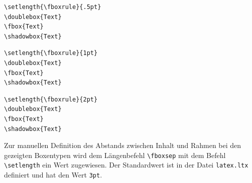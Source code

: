 \documentclass[a4paper,10pt,twoside]{scrbook}
\begin{document}
\begin{minipage}[c]{0.5\textwidth}
\setlength{\parskip}{1em}
\setlength{\fboxrule}{.4pt}
\hspace{5mm}
\hspace{5mm}
\hspace{5mm}
\hfill
\end{minipage}
\hfill
\begin{minipage}[c]{0.48\textwidth}
\setlength{\parskip}{1em}
\begin{lstlisting}[label=fboxrule2, style=customlatex]
\setlength{\fboxrule}{.5pt}
\doublebox{Text} 
\fbox{Text}
\shadowbox{Text}
\end{lstlisting}
\end{minipage}



\begin{minipage}[c]{0.5\textwidth}
\setlength{\parskip}{1em}
\setlength{\fboxrule}{1pt}
\hspace{5mm}
\hspace{5mm}
\hspace{5mm}
\hfill
\end{minipage}
\hfill
\begin{minipage}[c]{0.48\textwidth}
\setlength{\parskip}{1em}
\begin{lstlisting}[label=fboxrule3, style=customlatex]
\setlength{\fboxrule}{1pt}
\doublebox{Text} 
\fbox{Text}
\shadowbox{Text}
\end{lstlisting}
\end{minipage}



\begin{minipage}[c]{0.5\textwidth}
\setlength{\parskip}{1em}
\setlength{\fboxrule}{2pt}
\hspace{5mm}
\hspace{5mm}
\hspace{5mm}
\hfill
\end{minipage}
\hfill
\begin{minipage}[c]{0.48\textwidth}
\setlength{\parskip}{2em}
\begin{lstlisting}[label=fboxrule4, style=customlatex]
\setlength{\fboxrule}{2pt}
\doublebox{Text} 
\fbox{Text}
\shadowbox{Text}
\end{lstlisting}
\end{minipage}


Zur manuellen Definition des Abstands zwischen Inhalt und Rahmen bei den gezeigten Boxentypen wird dem 
Längenbefehl \verb!\fboxsep! mit dem 
Befehl \verb!\setlength! ein Wert zugewiesen. Der Standardwert ist in der Datei \verb!latex.ltx! definiert und hat den Wert \verb!3pt!. 
\end{document}
